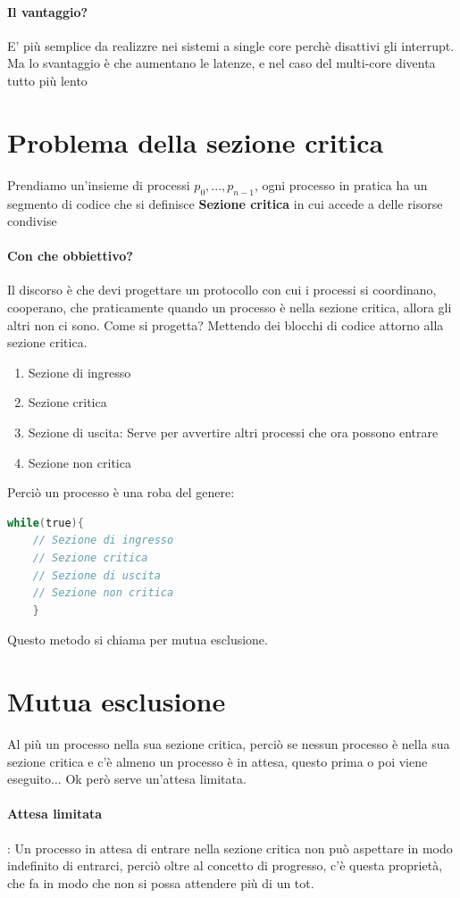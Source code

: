 \documentclass[12pt, a4paper, openany, twoside]{book}
\begin{document}
\paragraph{Il vantaggio?} 
E' più semplice da realizzre nei sistemi a single core perchè disattivi gli 
interrupt. Ma lo svantaggio è che aumentano le latenze, e nel caso del multi-core
diventa tutto più lento
\section{Problema della sezione critica}
Prendiamo un'insieme di processi $p_{0}, ..., p_{n-1}$, ogni processo in pratica
ha un segmento di codice che si definisce \textbf{Sezione critica} in cui accede
a delle risorse condivise
\paragraph{Con che obbiettivo? }Il discorso è che devi progettare un protocollo
con cui i processi si coordinano, cooperano, che praticamente quando un processo
è nella sezione critica, allora gli altri non ci sono. Come si progetta? Mettendo
dei blocchi di codice attorno alla sezione critica.
\begin{enumerate}
	\item Sezione di ingresso
	\item Sezione critica
	\item Sezione di uscita: Serve per avvertire altri processi che ora possono
	entrare
	\item Sezione non critica
\end{enumerate}
Perciò un processo è una roba del genere:
\begin{lstlisting}[language=C]
	while(true){
	// Sezione di ingresso
	// Sezione critica
	// Sezione di uscita
	// Sezione non critica
	}
\end{lstlisting}
Questo metodo si chiama per mutua esclusione.
\section{Mutua esclusione}
Al più un processo nella sua sezione critica, perciò se nessun processo è nella
sua sezione critica e c'è almeno un processo è in attesa, questo prima o poi 
viene eseguito... Ok però serve un'attesa limitata.
\paragraph{Attesa limitata}: Un processo in attesa di entrare nella sezione 
critica non può aspettare in modo indefinito di entrarci, perciò oltre al 
concetto di progresso, c'è questa proprietà, che fa in modo che non si possa
attendere più di un tot.
\end{document}

